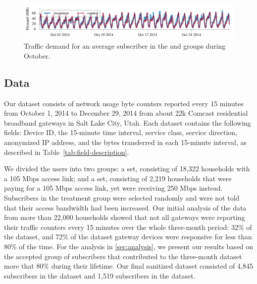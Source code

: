 \begin{figure}[t]
\centering
\includegraphics[width=\linewidth]{figures/traffic_demand_Oct.pdf}
  \caption{Traffic demand for an average subscriber in the \control{} and 
\treatment{} groups during October.\label{fig:traffic-load}}
\end{figure}


\subsection{Data}

Our dataset consists of network usage byte counters reported every 15
minutes from October 1, 2014 to December 29, 2014 from about 22k
Comcast residential broadband gateways in Salt Lake City, Utah. Each
dataset contains the following fields: Device ID, the 15-minute time interval,
service class, service direction, anonymized IP address, and the bytes
transferred in each 15-minute interval, as described in
Table~\ref{tab:field-description}.

We divided the users into two groups: a \control{} set, consisting of
18,322 households with a 105 Mbps access link; and a \treatment{} set,
consisting of 2,219 households that were paying for a 105 Mbps access
link, yet were receiving 250 Mbps instead.  Subscribers in the
treatment group were selected randomly and were not told that their
access bandwidth had been increased.  Our initial analysis of the data
from more than 22,000 households showed that not all gateways were
reporting their traffic counters every 15 minutes over the whole three-month
period: 32\% of the \treatment{} dataset, and 72\% of the \control{} dataset
gateway devices were responsive for less than 80\% of the time. For the
analysis in \autoref{sec:analysis}, we present our results based on the
accepted group of subscribers that contributed to the three-month dataset
more that 80\% during their lifetime. Our final sanitized dataset consisted of
4,845 subscribers in the \control{} dataset and 1,519 subscribers in the
\treatment{} dataset.


